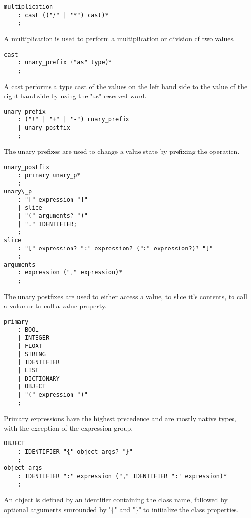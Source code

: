 \begin{lstlisting}
multiplication
    : cast (("/" | "*") cast)*
    ;
\end{lstlisting}

A multiplication is used to perform a multiplication or division of two values.

\begin{lstlisting}
cast
    : unary_prefix ("as" type)*
    ;
\end{lstlisting}

A cast performs a type cast of the values on the left hand side to the value of the right hand side by using the "as" reserved word.

\begin{lstlisting}
unary_prefix
    : ("!" | "+" | "-") unary_prefix
    | unary_postfix
    ;
\end{lstlisting}

The unary prefixes are used to change a value state by prefixing the operation.

\begin{lstlisting}
unary_postfix
    : primary unary_p*
    ;
unary\_p
    : "[" expression "]"
    | slice
    | "(" arguments? ")"
    | "." IDENTIFIER;
    ;
slice
    : "[" expression? ":" expression? (":" expression?)? "]"
    ;
arguments
    : expression ("," expression)*
    ;
\end{lstlisting}

The unary postfixes are used to either access a value, to slice it's contents, to call a value or to call a value property.

\begin{lstlisting}
primary
    : BOOL
    | INTEGER
    | FLOAT
    | STRING
    | IDENTIFIER
    | LIST
    | DICTIONARY
    | OBJECT
    | "(" expression ")"
    ;
\end{lstlisting}

Primary expressions have the highest precedence and are mostly native types, with the exception of the expression group.

\begin{lstlisting}
OBJECT
    : IDENTIFIER "{" object_args? "}"
    ;
object_args
    : IDENTIFIER ":" expression ("," IDENTIFIER ":" expression)*
    ;
\end{lstlisting}

An object is defined by an identifier containing the class name, followed by optional arguments surrounded by "\{" and "\}" to
initialize the class properties.

